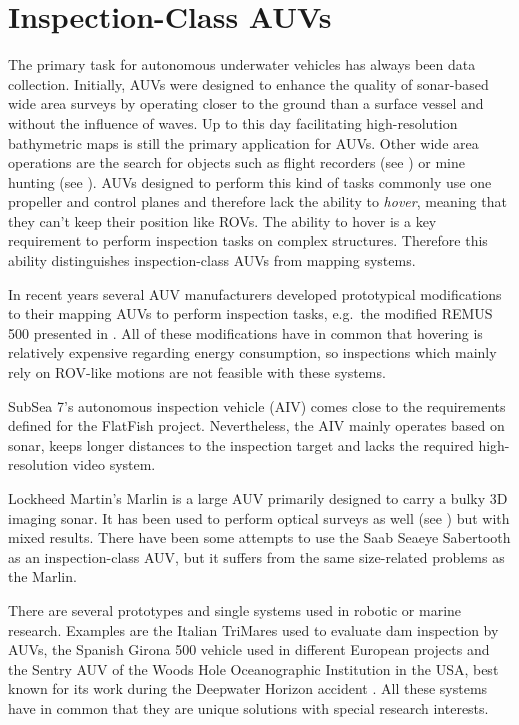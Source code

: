 \documentclass[conference]{IEEEtran}
\begin{document}
\section{Inspection-Class AUVs}

The primary task for autonomous underwater vehicles has always been data collection.
Initially, AUVs were designed to enhance the quality of sonar-based wide area surveys by
operating closer to the ground than a surface vessel and without the influence of waves. Up to this day
facilitating high-resolution bathymetric maps is still the primary application for AUVs.
Other wide area operations are the search for objects such as flight recorders (see
\cite{purcell2011}) or mine hunting (see \cite{Couillard2012}). AUVs designed to perform this
kind of tasks commonly use one propeller and control planes and therefore lack the
ability to \textit{hover}, meaning that they can't keep their position like ROVs. The
ability to hover is a key requirement to perform inspection tasks on complex structures.
Therefore this ability distinguishes inspection-class AUVs from mapping systems.

In recent years several AUV manufacturers developed prototypical modifications to their
mapping AUVs to perform inspection tasks, e.g.~the modified REMUS 500 presented in
\cite{packard2010}. All of these modifications have in common that hovering is relatively
expensive regarding energy consumption, so inspections which mainly rely on ROV-like motions are not
feasible with these systems.

SubSea 7's autonomous inspection vehicle (AIV) \cite{AIV} comes close to the requirements
defined for the FlatFish project. Nevertheless, the AIV mainly operates based on sonar, keeps longer distances to the inspection target and lacks the required high-resolution video system.

Lockheed Martin's Marlin \cite{Marlinmk1} is a large AUV primarily designed to carry a
bulky 3D imaging sonar. It has been used to perform optical surveys as well (see
\cite{mcleod2013}) but with mixed results. There have been some attempts to use the Saab
Seaeye Sabertooth \cite{johansson2010} as an inspection-class AUV, but it suffers from the
same size-related problems as the Marlin. 

There are several prototypes and single systems used in robotic or marine research.
Examples are the Italian TriMares \cite{cruz2011} used to evaluate dam inspection by AUVs,
the Spanish Girona 500 vehicle \cite{ribas2012} used in different European projects and
the Sentry AUV of the Woods Hole Oceanographic Institution in the USA, best known for its
work during the Deepwater Horizon accident \cite{Kinsey2011}. All these systems have in
common that they are unique solutions with special research interests.
\end{document}
